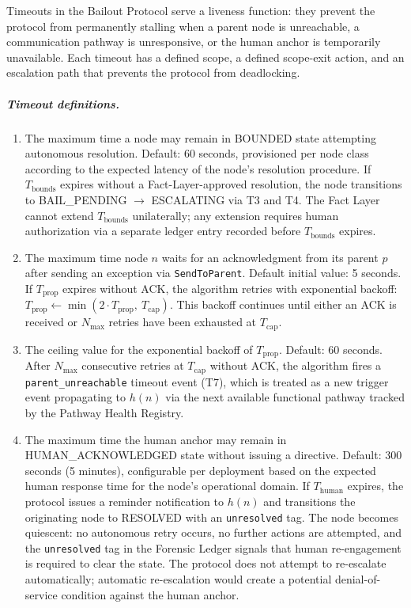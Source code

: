 Timeouts in the Bailout Protocol serve a liveness function: they prevent the protocol from permanently stalling when a parent node is unreachable, a communication pathway is unresponsive, or the human anchor is temporarily unavailable. Each timeout has a defined scope, a defined scope-exit action, and an escalation path that prevents the protocol from deadlocking.

\subparagraph{Timeout definitions.}

\begin{enumerate}
\item[\textbf{$T_{\text{bounds}}$ — Bounds Engine resolution timeout.}] The maximum time a node may remain in BOUNDED state attempting autonomous resolution. Default: 60 seconds, provisioned per node class according to the expected latency of the node's resolution procedure. If $T_{\text{bounds}}$ expires without a Fact-Layer-approved resolution, the node transitions to BAIL\_PENDING $\rightarrow$ ESCALATING via T3 and T4. The Fact Layer cannot extend $T_{\text{bounds}}$ unilaterally; any extension requires human authorization via a separate ledger entry recorded before $T_{\text{bounds}}$ expires.

\item[\textbf{$T_{\text{prop}}$ — Per-hop propagation timeout.}] The maximum time node $n$ waits for an acknowledgment from its parent $p$ after sending an exception via \texttt{SendToParent}. Default initial value: 5 seconds. If $T_{\text{prop}}$ expires without ACK, the algorithm retries with exponential backoff: $T_{\text{prop}} \leftarrow \min(2 \cdot T_{\text{prop}},\ T_{\text{cap}})$. This backoff continues until either an ACK is received or $N_{\max}$ retries have been exhausted at $T_{\text{cap}}$.

\item[\textbf{$T_{\text{cap}}$ — Maximum propagation timeout value.}] The ceiling value for the exponential backoff of $T_{\text{prop}}$. Default: 60 seconds. After $N_{\max}$ consecutive retries at $T_{\text{cap}}$ without ACK, the algorithm fires a \texttt{parent\_unreachable} timeout event (T7), which is treated as a new trigger event propagating to $h(n)$ via the next available functional pathway tracked by the Pathway Health Registry.

\item[\textbf{$T_{\text{human}}$ — Human acknowledgment timeout.}] The maximum time the human anchor may remain in HUMAN\_ACKNOWLEDGED state without issuing a directive. Default: 300 seconds (5 minutes), configurable per deployment based on the expected human response time for the node's operational domain. If $T_{\text{human}}$ expires, the protocol issues a reminder notification to $h(n)$ and transitions the originating node to RESOLVED with an \texttt{unresolved} tag. The node becomes quiescent: no autonomous retry occurs, no further actions are attempted, and the \texttt{unresolved} tag in the Forensic Ledger signals that human re-engagement is required to clear the state. The protocol does not attempt to re-escalate automatically; automatic re-escalation would create a potential denial-of-service condition against the human anchor.
\end{enumerate}

